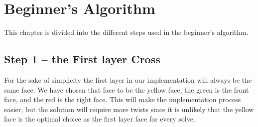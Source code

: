 \chapter{Beginner's Algorithm}
This chapter is divided into the different steps used in the beginner's algorithm.
\section{Step 1 -- the First layer Cross}
For the sake of simplicity the first layer in our implementation will always be the same face. We have chosen that face to be the yellow face, the green is the front face, and the red is the right face. This will make the implementation process easier, but the solution will require more twists since it is unlikely that the yellow face is the optimal choice as the first layer face for every solve.

